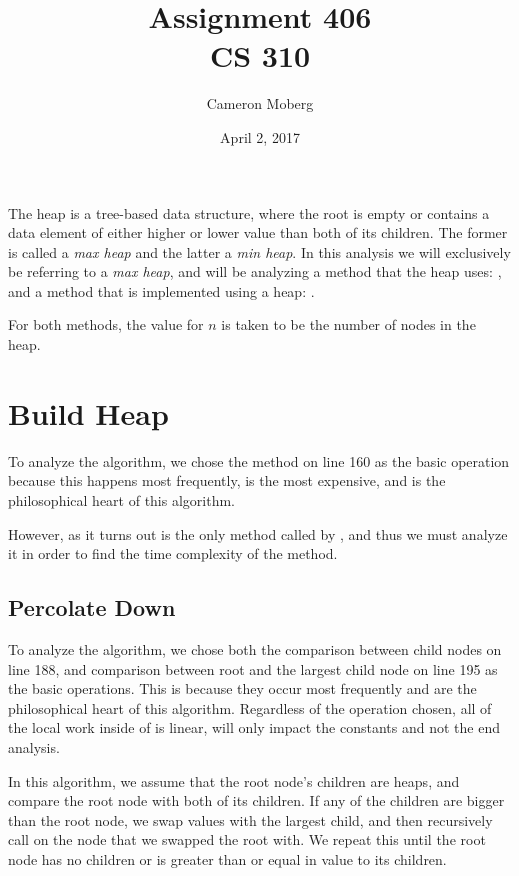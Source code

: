 \documentclass[11pt]{article}
\begin{document}
\thispagestyle{empty}
\title{Assignment 406 \\
\large CS 310}
\date{April 2, 2017}
\author{Cameron Moberg}
\maketitle

The heap is a tree-based data structure, where the root is empty or contains a data element of either higher or lower value than both of its children. 
The former is called a \textit{max heap} and the latter a \textit{min heap}.
In this analysis we will exclusively be referring to a \textit{max heap}, and will be analyzing a method that the heap uses: , and a method that is implemented using a heap: .

For both methods, the value for $n$ is taken to be the number of nodes in the heap.

\section{Build Heap}
To analyze the  algorithm, we chose the  method on line 160 as the basic operation because this happens most frequently, is the most expensive, and is the philosophical heart of this algorithm.

However, as it turns out  is the only method called by , and thus we must analyze it in order to find the time complexity of the   method.
\subsection{Percolate Down}

To analyze the  algorithm, we chose both the comparison between child nodes on line 188, and comparison between root and the largest child node on line 195 as the basic operations. This is because they occur most frequently and are the philosophical heart of this algorithm. Regardless of the operation chosen, all of the local work inside of  is linear, will only impact the constants and not the end analysis.

In this algorithm, we assume that the root node's children are heaps, and compare the root node with both of its children. If any of the children are bigger than the root node, we swap values with the largest child, and then recursively call  on the node that we swapped the root with. We repeat this until the root node has no children or is greater than or equal in value to its children.
\end{document}

